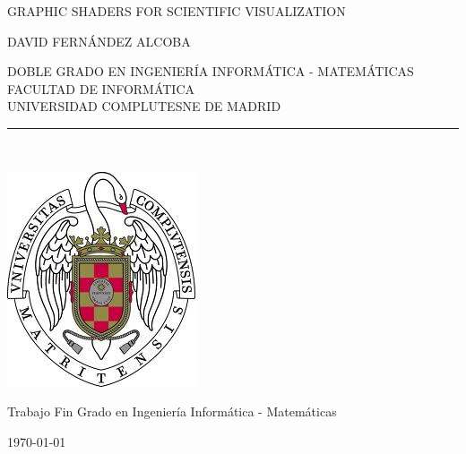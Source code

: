 \begin{center}

   \vspace{1cm}


   {\Large GRAPHIC SHADERS FOR SCIENTIFIC VISUALIZATION}\\

   \vspace{0.5cm}

   \vspace{0.5cm}

   {\large DAVID FERNÁNDEZ ALCOBA}\\

   \vspace{0.5cm}

   DOBLE GRADO EN INGENIERÍA INFORMÁTICA - MATEMÁTICAS\\ 
   FACULTAD DE INFORMÁTICA\\
   UNIVERSIDAD COMPLUTESNE DE MADRID \\


   \vspace{0.65cm}
   \rule{2in}{0.5pt}\\
   \vspace{1.85cm}

  \includegraphics[height=2.5in]{figures/escudo.jpg}
  

   \vspace{1.5cm}
Trabajo Fin Grado en Ingeniería Informática - Matemáticas

   \vspace{0.5cm}


  \today\\
   \vspace{1cm}

\end{center}

